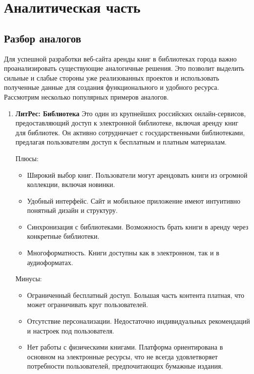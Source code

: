 \chapter{Аналитическая часть}

\section{Разбор аналогов}

Для успешной разработки веб-сайта аренды книг в библиотеках города важно проанализировать существующие аналогичные решения. Это позволит выделить сильные и слабые стороны уже реализованных проектов и использовать полученные данные для создания функционального и удобного ресурса. Рассмотрим несколько популярных примеров аналогов.

\begin{enumerate}
  \item \textbf{ЛитРес: Библиотека} \cite{litres}
  Это один из крупнейших российских онлайн-сервисов, предоставляющий доступ к электронной библиотеке, включая аренду книг для библиотек. Он активно сотрудничает с государственными библиотеками, предлагая пользователям доступ к бесплатным и платным материалам.

  Плюсы:
  \begin{itemize}
    \item Широкий выбор книг. Пользователи могут арендовать книги из огромной коллекции, включая новинки.
    \item Удобный интерфейс. Сайт и мобильное приложение имеют интуитивно понятный дизайн и структуру.
    \item Синхронизация с библиотеками. Возможность брать книги в аренду через конкретные библиотеки.
    \item Многоформатность. Книги доступны как в электронном, так и в аудиоформатах.
  \end{itemize}

  Минусы:
  \begin{itemize}
    \item Ограниченный бесплатный доступ. Большая часть контента платная, что может ограничивать круг пользователей.
    \item Отсутствие персонализации. Недостаточно индивидуальных рекомендаций и настроек под пользователя.
    \item Нет работы с физическими книгами. Платформа ориентирована в основном на электронные ресурсы, что не всегда удовлетворяет потребности пользователей, предпочитающих бумажные издания.
  \end{itemize}


\end{enumerate}
